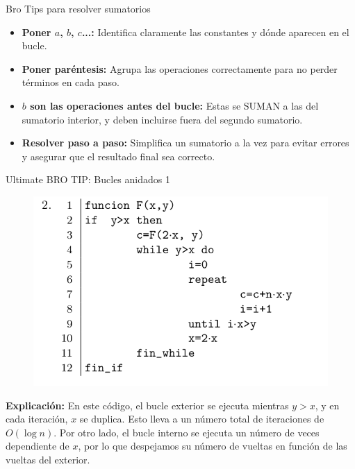 \documentclass[aspectratio=169]{beamer}
\begin{document}
\begin{frame}{Bro Tips para resolver sumatorios}
\begin{itemize}
    \item \textbf{Poner \(a\), \(b\), \(c\)...:} Identifica claramente las constantes y dónde aparecen en el bucle.
    \item \textbf{Poner paréntesis:} Agrupa las operaciones correctamente para no perder términos en cada paso.
    \item \textbf{\(b\) son las operaciones antes del bucle:} Estas se SUMAN a las del sumatorio interior, y deben incluirse fuera del segundo sumatorio.
    \item \textbf{Resolver paso a paso:} Simplifica un sumatorio a la vez para evitar errores y asegurar que el resultado final sea correcto.
\end{itemize}
\end{frame}

\begin{frame}{Ultimate BRO TIP: Bucles anidados 1 }
\begin{figure}
    \centering
    \includegraphics[width=0.5\linewidth]{sumatorio-ejercicio.png}
    \label{fig:enter-label}
\end{figure}
\textbf{Explicación:} 
En este código, el bucle exterior se ejecuta mientras $y > x$, y en cada iteración, $x$ se duplica. Esto lleva a un número total de iteraciones de $O(\log n)$. Por otro lado, el bucle interno se ejecuta un número de veces dependiente de $x$, por lo que despejamos su número de vueltas en función de las vueltas del exterior.
\end{frame}
\end{document}

